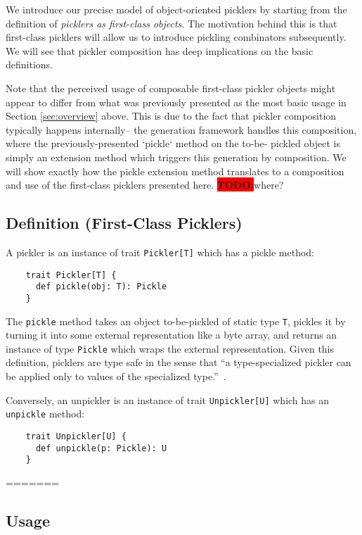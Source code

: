 \documentclass[preprint,10pt]{sigplanconf}
\newcommand{\todo}{{\bf \colorbox{red}{\color{white}TODO:}}}
\begin{document}
We introduce our precise model of object-oriented picklers by starting from
the definition of {\em picklers as first-class objects}. The motivation behind
this is that first-class picklers will allow us to introduce pickling
combinators subsequently. We will see that pickler composition has deep
implications on the basic definitions.

Note that the perceived usage of composable first-class pickler objects might
appear to differ from what was previously presented as the most basic usage in
Section \ref{sec:overview} above. This is due to the fact that pickler
composition typically happens internally-- the generation framework handles
this composition, where the previously-presented `pickle` method on the to-be-
pickled object is simply an extension method which triggers this generation by
composition. We will show exactly how the pickle extension method translates
to a composition and use of the first-class picklers presented here.
\todo where?

\subsection{Definition (First-Class Picklers)}

A pickler is an instance of trait \verb|Pickler[T]| which has a pickle method:

\begin{lstlisting}
    trait Pickler[T] {
      def pickle(obj: T): Pickle
    }
\end{lstlisting}

The \verb|pickle| method takes an object to-be-pickled of static type
\verb|T|, pickles it by turning it into some external representation like a
byte array, and returns an instance of type \verb|Pickle| which wraps the
external representation. Given this definition, picklers are type safe in the
sense that ``a type-specialized pickler can be applied only to values of the
specialized type.''~\cite{Elsman2005}.

Conversely, an unpickler is an instance of trait \verb|Unpickler[U]| which has an \verb|unpickle| method:

\begin{verbatim}
    trait Unpickler[U] {
      def unpickle(p: Pickle): U
    }
\end{verbatim}

=======

\subsection{Usage}
\end{document}
